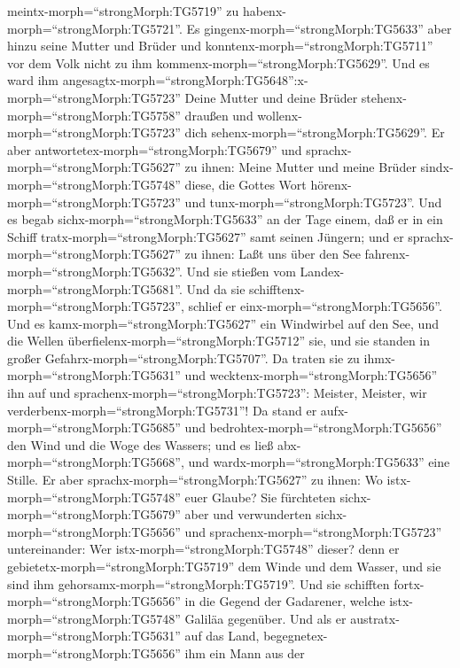 meintx-morph=``strongMorph:TG5719'' zu
habenx-morph=``strongMorph:TG5721''.  Es
gingenx-morph=``strongMorph:TG5633'' aber hinzu seine Mutter und Brüder
und konntenx-morph=``strongMorph:TG5711'' vor dem Volk nicht zu ihm
kommenx-morph=``strongMorph:TG5629''.  Und es ward ihm
angesagtx-morph=``strongMorph:TG5648'':x-morph=``strongMorph:TG5723''
Deine Mutter und deine Brüder stehenx-morph=``strongMorph:TG5758''
draußen und wollenx-morph=``strongMorph:TG5723'' dich
sehenx-morph=``strongMorph:TG5629''.  Er aber
antwortetex-morph=``strongMorph:TG5679'' und
sprachx-morph=``strongMorph:TG5627'' zu ihnen: Meine Mutter und meine
Brüder sindx-morph=``strongMorph:TG5748'' diese, die Gottes Wort
hörenx-morph=``strongMorph:TG5723'' und
tunx-morph=``strongMorph:TG5723''.  Und es begab
sichx-morph=``strongMorph:TG5633'' an der Tage einem, daß er in ein
Schiff tratx-morph=``strongMorph:TG5627'' samt seinen Jüngern; und er
sprachx-morph=``strongMorph:TG5627'' zu ihnen: Laßt uns über den See
fahrenx-morph=``strongMorph:TG5632''. Und sie stießen vom
Landex-morph=``strongMorph:TG5681''.  Und da sie
schifftenx-morph=``strongMorph:TG5723'', schlief er
einx-morph=``strongMorph:TG5656''. Und es
kamx-morph=``strongMorph:TG5627'' ein Windwirbel auf den See, und die
Wellen überfielenx-morph=``strongMorph:TG5712'' sie, und sie standen in
großer Gefahrx-morph=``strongMorph:TG5707''.  Da traten sie
zu ihmx-morph=``strongMorph:TG5631'' und
wecktenx-morph=``strongMorph:TG5656'' ihn auf und
sprachenx-morph=``strongMorph:TG5723'': Meister, Meister, wir
verderbenx-morph=``strongMorph:TG5731''! Da stand er
aufx-morph=``strongMorph:TG5685'' und
bedrohtex-morph=``strongMorph:TG5656'' den Wind und die Woge des
Wassers; und es ließ abx-morph=``strongMorph:TG5668'', und
wardx-morph=``strongMorph:TG5633'' eine Stille.  Er aber
sprachx-morph=``strongMorph:TG5627'' zu ihnen: Wo
istx-morph=``strongMorph:TG5748'' euer Glaube? Sie fürchteten
sichx-morph=``strongMorph:TG5679'' aber und verwunderten
sichx-morph=``strongMorph:TG5656'' und
sprachenx-morph=``strongMorph:TG5723'' untereinander: Wer
istx-morph=``strongMorph:TG5748'' dieser? denn er
gebietetx-morph=``strongMorph:TG5719'' dem Winde und dem Wasser, und sie
sind ihm gehorsamx-morph=``strongMorph:TG5719''.  Und sie
schifften fortx-morph=``strongMorph:TG5656'' in die Gegend der
Gadarener, welche istx-morph=``strongMorph:TG5748'' Galiläa gegenüber.
 Und als er austratx-morph=``strongMorph:TG5631'' auf das
Land, begegnetex-morph=``strongMorph:TG5656'' ihm ein Mann aus der

